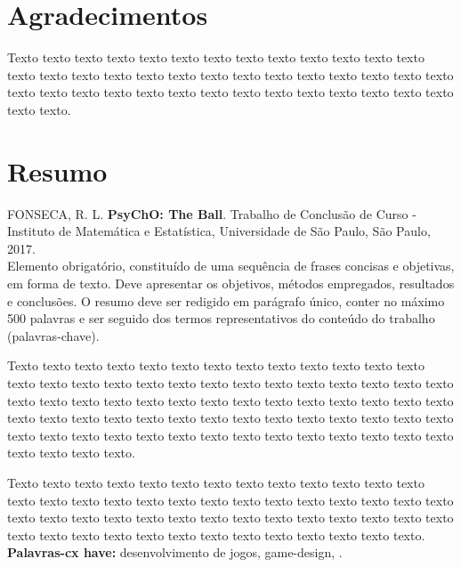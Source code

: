 \chapter*{Agradecimentos}

Texto texto texto texto texto texto texto texto texto texto texto texto texto
texto texto texto texto texto texto texto texto texto texto texto texto texto
texto texto texto texto texto texto texto texto texto texto texto texto texto
texto texto texto texto.

\chapter*{Resumo}

\noindent%
FONSECA, R. L. \textbf{PsyChO: The Ball}. Trabalho de Conclusão de Curso
 - Instituto de Matemática e Estatística, Universidade de São Paulo,
São Paulo, 2017.
\\

Elemento obrigatório, constituído de uma sequência de frases concisas e
objetivas, em forma de texto.  Deve apresentar os objetivos, métodos empregados,
resultados e conclusões.  O resumo deve ser redigido em parágrafo único, conter
no máximo 500 palavras e ser seguido dos termos representativos do conteúdo do
trabalho (palavras-chave).

Texto texto texto texto texto texto texto texto texto texto texto texto texto
texto texto texto texto texto texto texto texto texto texto texto texto texto
texto texto texto texto texto texto texto texto texto texto texto texto texto
texto texto texto texto texto texto texto texto texto texto texto texto texto
texto texto texto texto texto texto texto texto texto texto texto texto texto
texto texto texto texto texto texto texto texto.

Texto texto texto texto texto texto texto texto texto texto texto texto texto
texto texto texto texto texto texto texto texto texto texto texto texto texto
texto texto texto texto texto texto texto texto texto texto texto texto texto
texto texto texto texto texto texto texto texto texto texto texto texto texto
texto texto.
\\

\noindent%
\textbf{Palavras-cx have:} desenvolvimento de jogos, game-design, .
